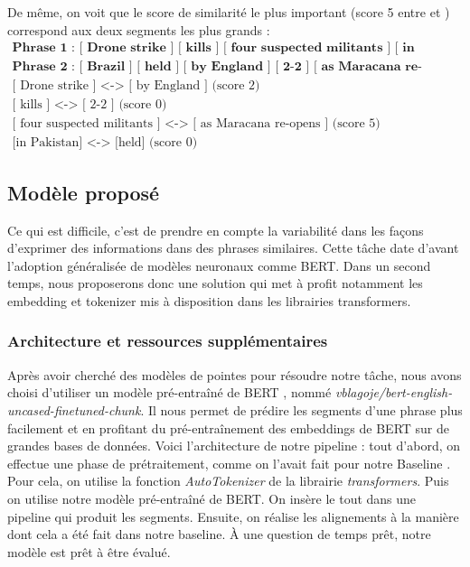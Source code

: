 \documentclass[a4paper, twoside, 11pt]{article}
\begin{document}
De même, on voit que le score de similarité le plus important (score 5 entre  \fg{} et \fg{}) correspond aux deux segments les plus grands :
\begin{eqnarray*}
\textbf{Phrase 1 : [ Drone strike ] [ kills ] [ four suspected militants ] [ in Pakistan ]}\\
\textbf{Phrase 2 : [ Brazil ] [ held ] [ by England ] [ 2-2 ] [ as Maracana re-opens ]}\\
\textrm{[ Drone strike ] <-> [ by England ] (score 2)}\\
\textrm{[ kills ] <-> [ 2-2 ] (score 0)}\\
\textrm{[ four suspected militants ] <-> [ as Maracana re-opens ] (score 5)}\\
\textrm{[in Pakistan] <-> [held] (score 0)}
\end{eqnarray*}

    \subsection{Modèle proposé}
     Ce qui est difficile, c’est de prendre en compte la variabilité dans les façons d’exprimer des informations dans des phrases similaires. Cette tâche date d’avant l’adoption généralisée de modèles neuronaux comme BERT. Dans un second temps, nous proposerons donc une solution qui met à profit notamment les embedding et tokenizer mis à disposition dans les librairies transformers.

 \subsubsection{Architecture et ressources supplémentaires}
 Après avoir cherché des modèles de pointes pour résoudre notre tâche, nous avons choisi d’utiliser un modèle pré-entraîné de \og BERT \fg{}, nommé \textit{vblagoje/bert-english-uncased-finetuned-chunk}. Il nous permet de prédire les segments d’une phrase plus facilement et en profitant du pré-entraînement des embeddings de BERT sur de grandes bases de données. Voici l’architecture de notre pipeline : tout d’abord, on effectue une phase de prétraitement, comme on l'avait fait pour notre \og Baseline \fg{}. Pour cela, on utilise la fonction \textit{AutoTokenizer} de la librairie \textit{transformers}. Puis on utilise notre modèle pré-entraîné de BERT. On insère le tout dans une pipeline qui produit les segments. Ensuite, on réalise les alignements à la manière dont cela a été fait dans notre baseline. À une question de temps prêt, notre modèle est prêt à être évalué.
\end{document}
